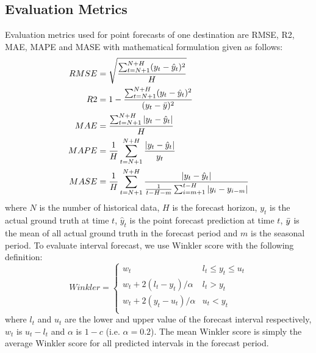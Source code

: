 \documentclass{article}
\begin{document}
\subsection{Evaluation Metrics}
\label{appx:metric}
Evaluation metrics used for point forecasts of one destination are RMSE, R2, MAE, MAPE and MASE with mathematical formulation given as follows:
\[
\begin{split}
    {RMSE} &= \sqrt{\frac{\sum_{t=N+1}^{N+H} (y_t - \hat{y}_t)^2}{H}} \\
    {R2} &= 1 - \frac{\sum_{t=N+1}^{N+H} (y_t - \hat{y}_t)^2}{(y_t - \Bar{y}) ^ 2} \\
    {MAE} &= \frac{\sum_{t=N+1}^{N+H} |y_t - \hat{y}_t|}{H} \\
    {MAPE} &= \frac{1}{H} \sum_{t=N+1}^{N+H} \frac{|y_t - \hat{y}_t|}{y_t} \\
    {MASE} &= \frac{1}{H} \sum_{t=N+1}^{N+H} \frac{|y_t - \hat{y}_t|}{\frac{1}{t-H-m} \sum_{i=m+1}^{t-H} |y_i - y_{i-m}|} \\
\end{split}
\]
where $N$ is the number of historical data, $H$ is the forecast horizon, $y_t$ is the actual ground truth at time $t$, $\hat{y}_t$ is the point forecast prediction at time $t$, $\Bar{y}$ is the mean of all actual ground truth in the forecast period and $m$ is the seasonal period. To evaluate interval forecast, we use Winkler score \cite{winkler} with the following definition:
\[{Winkler} = 
\begin{cases}
    w_t & l_t \leq y_t \leq u_t \\
    w_t + 2(l_t-y_t)/\alpha & l_t > y_t \\
    w_t + 2(y_t - u_t)/\alpha & u_t < y_t \\
\end{cases}
\]
where $l_t$ and $u_t$ are the lower and upper value of the forecast interval respectively, $w_t$ is $u_t - l_t$ and $\alpha$ is $1-c$ (i.e. $\alpha=0.2$). The mean Winkler score is simply the average Winkler score for all predicted intervals in the forecast period.
\end{document}
